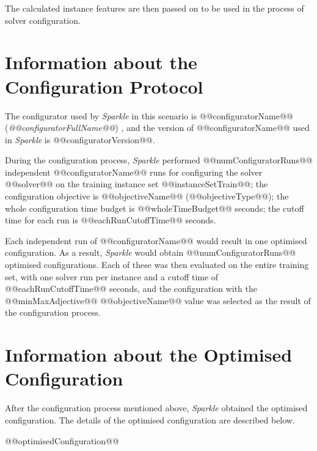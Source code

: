 \documentclass[british]{article}
\newif\iffeatures
\begin{document}
        The calculated instance features are then passed on to be used in the process of solver configuration. 

\fi


\section{Information about the Configuration Protocol}

The configurator used by \emph{Sparkle} in this scenario is @@configuratorName@@ ({\em @@configuratorFullName@@}) \cite{@@configuratorName@@}, and the version of @@configuratorName@@ used in \emph{Sparkle} is @@configuratorVersion@@.

During the configuration process, \emph{Sparkle} performed @@numConfiguratorRuns@@ independent @@configuratorName@@ runs for configuring the solver @@solver@@ on the training instance set @@instanceSetTrain@@\iffeatures; the instance features of the training instance set were used for configuration\fi; the configuration objective is @@objectiveName@@ (@@objectiveType@@); the whole configuration time budget is @@wholeTimeBudget@@ seconds; the cutoff time for each run is @@eachRunCutoffTime@@ seconds.

Each independent run of @@configuratorName@@ would result in one optimised configuration. As a result, \emph{Sparkle} would obtain @@numConfiguratorRuns@@ optimised configurations. Each of these was then evaluated on the entire training set, with one solver run per instance and a cutoff time of @@eachRunCutoffTime@@ seconds, and the configuration with the @@minMaxAdjective@@ @@objectiveName@@ value was selected as the result of the configuration process.

\section{Information about the Optimised Configuration}

After the configuration process mentioned above, \emph{Sparkle} obtained the optimised configuration. The details of the optimised configuration are described below.

\vspace{5mm}

\begin{enumerate}
@@optimisedConfiguration@@
\end{enumerate}

\vspace{5mm}
\end{document}
